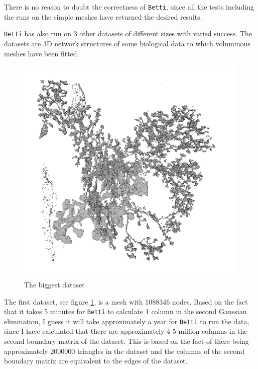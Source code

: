 \documentclass[11pt,a4paper,twoside]{report}
\begin{document}
There is no reason to doubt the correctness of \texttt{Betti}, since all the tests including the runs on the simple meshes have returned the desired results.

\texttt{Betti} has also run on 3 other datasets of different sizes with varied success. 
The datasets are 3D network structures of some biological data to which voluminous meshes have been fitted.
\begin{figure}[H]
\center
\includegraphics[scale=0.5]{downsampled00.png}
\caption{The biggest dataset}
\label{fig:mesh_down}
\end{figure}
The first dataset, see figure \ref{fig:mesh_down}, is a mesh with 1088346 nodes. Based on the fact that it takes 5 minutes for \texttt{Betti} to calculate 1 column in the second Gaussian elimination, I guess it will take approximately a year for \texttt{Betti} to run the data, since I have calculated that there are approximately 4-5 million columns in the second boundary matrix of the dataset. This is based on the fact of there being approximately 2000000 triangles in the dataset and the columns of the second boundary matrix are equivalent to the edges of the dataset.
\end{document}
